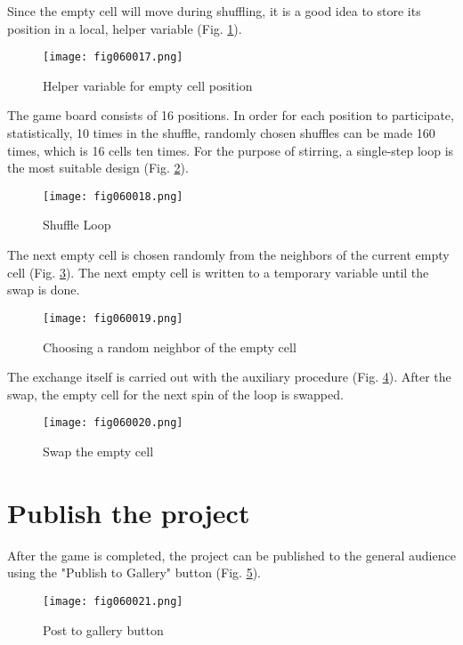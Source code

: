 Since the empty cell will move during shuffling, it is a good idea to store its position in a local, helper variable (Fig. \ref{fig060017}).

\begin{figure}[H]
   \centering
   \texttt{[image: fig060017.png]}
   \caption{Helper variable for empty cell position}
\label{fig060017}
\end{figure}

The game board consists of 16 positions. In order for each position to participate, statistically, 10 times in the shuffle, randomly chosen shuffles can be made 160 times, which is 16 cells ten times. For the purpose of stirring, a single-step loop is the most suitable design (Fig. \ref{fig060018}).

\begin{figure}[H]
   \centering
   \texttt{[image: fig060018.png]}
   \caption{Shuffle Loop}
\label{fig060018}
\end{figure}

The next empty cell is chosen randomly from the neighbors of the current empty cell (Fig. \ref{fig060019}). The next empty cell is written to a temporary variable until the swap is done.

\begin{figure}[H]
   \centering
   \texttt{[image: fig060019.png]}
   \caption{Choosing a random neighbor of the empty cell}
\label{fig060019}
\end{figure}

The exchange itself is carried out with the auxiliary procedure (Fig. \ref{fig060020}). After the swap, the empty cell for the next spin of the loop is swapped.

\begin{figure}[H]
   \centering
   \texttt{[image: fig060020.png]}
   \caption{Swap the empty cell}
\label{fig060020}
\end{figure}

\section{Publish the project}

After the game is completed, the project can be published to the general audience using the "Publish to Gallery" button (Fig. \ref{fig060021}).

\begin{figure}[H]
   \centering
   \texttt{[image: fig060021.png]}
   \caption{Post to gallery button}
\label{fig060021}
\end{figure}

